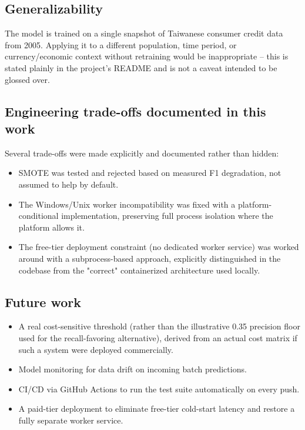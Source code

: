 \documentclass[11pt]{article}
\begin{document}
\subsection{Generalizability}
The model is trained on a single snapshot of Taiwanese consumer credit
data from 2005. Applying it to a different population, time period, or
currency/economic context without retraining would be inappropriate --
this is stated plainly in the project's README and is not a caveat
intended to be glossed over.

\subsection{Engineering trade-offs documented in this work}
Several trade-offs were made explicitly and documented rather than hidden:
\begin{itemize}[nosep]
    \item SMOTE was tested and rejected based on measured F1 degradation,
    not assumed to help by default.
    \item The Windows/Unix worker incompatibility was fixed with a
    platform-conditional implementation, preserving full process isolation
    where the platform allows it.
    \item The free-tier deployment constraint (no dedicated worker service)
    was worked around with a subprocess-based approach, explicitly
    distinguished in the codebase from the "correct" containerized
    architecture used locally.
\end{itemize}

\subsection{Future work}
\begin{itemize}[nosep]
    \item A real cost-sensitive threshold (rather than the illustrative
    0.35 precision floor used for the recall-favoring alternative), derived
    from an actual cost matrix if such a system were deployed commercially.
    \item Model monitoring for data drift on incoming batch predictions.
    \item CI/CD via GitHub Actions to run the test suite automatically on
    every push.
    \item A paid-tier deployment to eliminate free-tier cold-start latency
    and restore a fully separate worker service.
\end{itemize}
\end{document}
